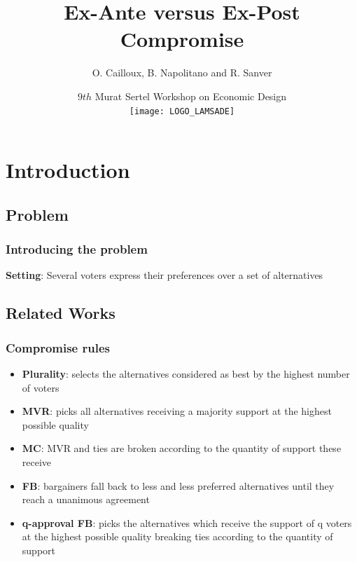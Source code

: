 \documentclass{beamer}
\title[Ex-Ante vs Ex-Post Compromise]{Ex-Ante versus Ex-Post Compromise}
\institute[]{LAMSADE, Université Paris-Dauphine, Paris, France}
\author[O. Cailloux, B. Napolitano, R. Sanver]{O. Cailloux, B. Napolitano and R. Sanver}
\date[31 Oct 2019]{{\small $9th$ Murat Sertel Workshop on Economic Design} \\ \texttt{[image: LOGO\_LAMSADE]} }
\begin{document}
\beamertemplatenavigationsymbolsempty

\begin{frame}[plain]
\maketitle
\end{frame}

\addtocounter{framenumber}{-1}


\section{Introduction}
\subsection{Problem}

\begin{frame}
\frametitle{Introducing the problem}
\textbf{Setting}: Several voters express their preferences over a set of alternatives \vspace{6mm}

\end{frame}

\subsection{Related Works}
\begin{frame}
	\frametitle{Compromise rules}
	\begin{itemize}
		\item<1-> \textbf{Plurality}: selects the alternatives considered as best by the highest number of voters 
		\item<2-> \textbf{MVR}: picks all alternatives receiving a majority support at the highest possible quality
		\item<3-> \textbf{MC}: MVR and ties are broken according to the quantity of support these receive
		\item<4-> \textbf{FB}: bargainers fall back to less and	less preferred alternatives until they reach a unanimous agreement 
		\item<5-> \textbf{q-approval FB}: picks the alternatives which receive the support of q voters at the highest possible quality breaking ties according to the quantity of support
	\end{itemize}
\end{frame}
\end{document}
